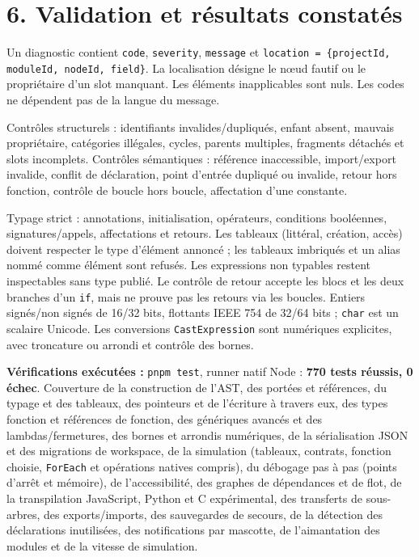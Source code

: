 \documentclass[11pt,a4paper]{article}
\newcommand{\code}[1]{\texttt{#1}}
\newcommand{\chaptertitle}[2]{\noindent{\small\sffamily SAPPHIRE 3 --- FONDATIONS LOGIQUES\hfill #1/4}\par\vspace{4mm}{\LARGE\sffamily\bfseries #2}\par\vspace{3mm}}
\begin{document}
\newpage
\chaptertitle{4}{Vérification et évolutivité}
\section*{6. Validation et résultats constatés}
Un diagnostic contient \code{code}, \code{severity}, \code{message} et
\code{location = \{projectId, moduleId, nodeId, field\}}. La localisation
désigne le nœud fautif ou le propriétaire d'un slot manquant. Les éléments
inapplicables sont nuls. Les codes ne dépendent pas de la langue du message.

Contrôles structurels : identifiants invalides/dupliqués, enfant absent,
mauvais propriétaire, catégories illégales, cycles, parents multiples,
fragments détachés et slots incomplets. Contrôles sémantiques : référence
inaccessible, import/export invalide, conflit de déclaration, point d'entrée
dupliqué ou invalide, retour hors fonction, contrôle de boucle hors boucle,
affectation d'une constante.

Typage strict : annotations, initialisation, opérateurs, conditions booléennes,
signatures/appels, affectations et retours. Les tableaux (littéral, création,
accès) doivent respecter le type d'élément annoncé ; les tableaux imbriqués et
un alias nommé comme élément sont refusés. Les expressions non typables restent
inspectables sans type publié. Le contrôle de retour accepte les blocs et les
deux branches d'un \code{if}, mais ne prouve pas les retours via les boucles.
Entiers signés/non signés de 16/32 bits, flottants IEEE 754 de 32/64 bits ;
\code{char} est un scalaire Unicode. Les conversions \code{CastExpression}
sont numériques explicites, avec troncature ou arrondi et contrôle des bornes.

\textbf{Vérifications exécutées :} \code{pnpm test}, runner natif Node :
\textbf{770 tests réussis, 0 échec}. Couverture de la construction de l'AST,
des portées et références, du typage et des tableaux, des pointeurs et de
l'écriture à travers eux, des types fonction et références de fonction, des
génériques avancés et des lambdas/fermetures, des bornes et arrondis numériques,
de la sérialisation JSON et des migrations de workspace, de la simulation
(tableaux, contrats, fonction choisie, \code{ForEach} et opérations natives
compris), du débogage pas à pas (points d'arrêt et mémoire), de l'accessibilité,
des graphes de dépendances et de flot, de la transpilation JavaScript, Python et C expérimental,
des transferts de sous-arbres, des exports/imports, des sauvegardes de secours,
de la détection des déclarations inutilisées, des notifications par mascotte,
de l'aimantation des modules et de la vitesse de simulation.
\end{document}
